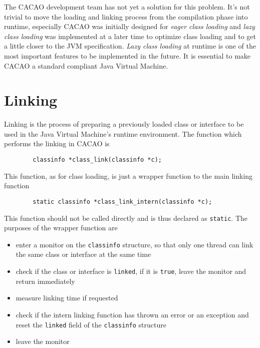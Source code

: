 The CACAO development team has not yet a solution for this
problem. It's not trivial to move the loading and linking process from
the compilation phase into runtime, especially CACAO was initially
designed for \textit{eager class loading} and \textit{lazy class
loading} was implemented at a later time to optimize class loading and
to get a little closer to the JVM specification. \textit{Lazy class
loading} at runtime is one of the most important features to be
implemented in the future. It is essential to make CACAO a standard
compliant Java Virtual Machine.


\section{Linking}
\label{sectionlinking}

Linking is the process of preparing a previously loaded class or
interface to be used in the Java Virtual Machine's runtime
environment. The function which performs the linking in CACAO is

\begin{verbatim}
        classinfo *class_link(classinfo *c);
\end{verbatim}

This function, as for class loading, is just a wrapper function to the
main linking function

\begin{verbatim}
        static classinfo *class_link_intern(classinfo *c);
\end{verbatim}

This function should not be called directly and is thus declared as
\texttt{static}. The purposes of the wrapper function are

\begin{itemize}
 \item enter a monitor on the \texttt{classinfo} structure, so that
 only one thread can link the same class or interface at the same time

 \item check if the class or interface is \texttt{linked}, if it is
 \texttt{true}, leave the monitor and return immediately

 \item measure linking time if requested

 \item check if the intern linking function has thrown an error or an
 exception and reset the \texttt{linked} field of the
 \texttt{classinfo} structure

 \item leave the monitor
\end{itemize}

